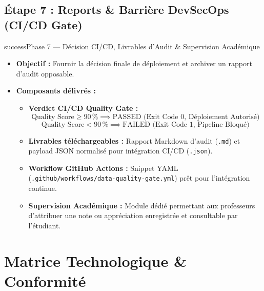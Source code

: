 \documentclass[11pt,a4paper]{article}
\begin{document}
\subsection*{Étape 7 : Reports \& Barrière DevSecOps (CI/CD Gate)}
\begin{stepbox}{success}{Phase 7 — Décision CI/CD, Livrables d'Audit \& Supervision Académique}
\begin{itemize}
    \item \textbf{Objectif :} Fournir la décision finale de déploiement et archiver un rapport d'audit opposable.
    \item \textbf{Composants délivrés :}
    \begin{itemize}
        \item \textbf{Verdict CI/CD Quality Gate :}
        \begin{equation*}
            \text{Quality Score} \ge 90\,\% \implies \text{PASSED (Exit Code 0, Déploiement Autorisé)}
        \end{equation*}
        \begin{equation*}
            \text{Quality Score} < 90\,\% \implies \text{FAILED (Exit Code 1, Pipeline Bloqué)}
        \end{equation*}
        \item \textbf{Livrables téléchargeables :} Rapport Markdown d'audit (\texttt{.md}) et payload JSON normalisé pour intégration CI/CD (\texttt{.json}).
        \item \textbf{Workflow GitHub Actions :} Snippet YAML (\texttt{.github/workflows/data-quality-gate.yml}) prêt pour l'intégration continue.
        \item \textbf{Supervision Académique :} Module dédié permettant aux professeurs d'attribuer une note ou appréciation enregistrée et consultable par l'étudiant.
    \end{itemize}
\end{itemize}
\end{stepbox}

\vspace{10pt}


\section*{Matrice Technologique \& Conformité}
\end{document}
